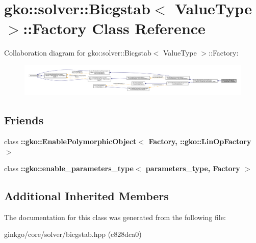 \hypertarget{classgko_1_1solver_1_1Bicgstab_1_1Factory}{}\section{gko\+:\+:solver\+:\+:Bicgstab$<$ Value\+Type $>$\+:\+:Factory Class Reference}
\label{classgko_1_1solver_1_1Bicgstab_1_1Factory}


Collaboration diagram for gko\+:\+:solver\+:\+:Bicgstab$<$ Value\+Type $>$\+:\+:Factory\+:
\nopagebreak
\begin{figure}[H]
\begin{center}
\leavevmode
\includegraphics[width=350pt]{classgko_1_1solver_1_1Bicgstab_1_1Factory__coll__graph}
\end{center}
\end{figure}
\subsection*{Friends}
\begin{DoxyCompactItemize}
\item 
\mbox{\label{classgko_1_1solver_1_1Bicgstab_1_1Factory_a27e9bbc94a1c1c59f40833153eda8f78}} 
class {\bfseries \+::gko\+::\+Enable\+Polymorphic\+Object$<$ Factory, \+::gko\+::\+Lin\+Op\+Factory $>$}
\item 
\mbox{\label{classgko_1_1solver_1_1Bicgstab_1_1Factory_a0d176cbd42d6214e11aee8c30ca256fc}} 
class {\bfseries \+::gko\+::enable\+\_\+parameters\+\_\+type$<$ parameters\+\_\+type, Factory $>$}
\end{DoxyCompactItemize}
\subsection*{Additional Inherited Members}


The documentation for this class was generated from the following file\+:\begin{DoxyCompactItemize}
\item 
ginkgo/core/solver/bicgstab.\+hpp (c828dca0)\end{DoxyCompactItemize}
